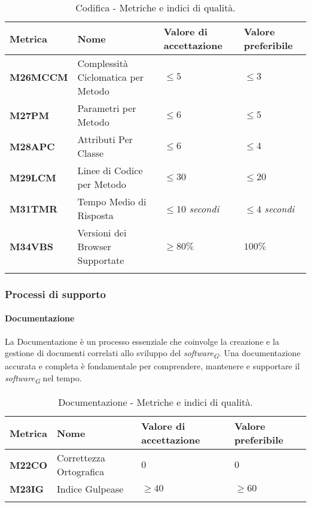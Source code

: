 \hspace{1pt}
    \begin{longtable}{|C{1.8cm}|L{3cm}|L{2.5cm}|L{2.5cm}|}
        \hline
        \textbf{Metrica} & \textbf{Nome} & \textbf{Valore di accettazione} & \textbf{Valore preferibile} \\
        \hline
        \textbf{M26MCCM} & Complessità Ciclomatica per Metodo & $\leq 5$ & $\leq 3$ \\
        \hline
        \textbf{M27PM} & Parametri per Metodo & $\leq 6$ & $\leq 5$ \\
        \hline
        \textbf{M28APC} & Attributi Per Classe & $\leq 6$ & $\leq 4$ \\
        \hline
        \textbf{M29LCM} & Linee di Codice per Metodo & $\leq 30$ & $\leq 20$ \\
        \hline
        \textbf{M31TMR} & Tempo Medio di Risposta & $\leq 10$ \textit{secondi}  & $\leq 4$ \textit{secondi} \\
        \hline
        \textbf{M34VBS} & Versioni dei Browser Supportate & $\geq 80\%$ & $100\%$ \\
        \hline
    \caption{Codifica - Metriche e indici di qualità.}
    \label{tab:metriche}
\end{longtable}




\subsubsection{Processi di supporto}

\paragraph{Documentazione}
La Documentazione è un processo essenziale che coinvolge la creazione e la gestione di documenti correlati allo sviluppo del \textit{software}\textsubscript{\textit{G}}. Una documentazione accurata e completa è fondamentale per comprendere, mantenere e supportare il \textit{software}\textsubscript{\textit{G}} nel tempo.
\hspace{1pt}
    \begin{longtable}{|C{1.5cm}|L{3cm}|L{2.5cm}|L{2.5cm}|}
        \hline
        \textbf{Metrica} & \textbf{Nome} & \textbf{Valore di accettazione} & \textbf{Valore preferibile} \\
        \hline
        \textbf{M22CO} & Correttezza Ortografica & $0$ & $0$ \\
        \hline
        \textbf{M23IG} & Indice Gulpease & $\geq 40$ & $\geq 60$ \\
        \hline
    \caption{Documentazione - Metriche e indici di qualità.}
    \label{tab:metriche_testo}
\end{longtable}

